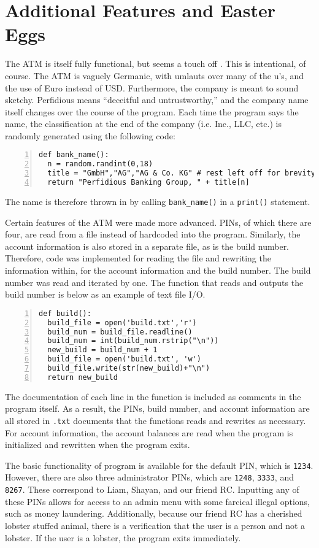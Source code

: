 \documentclass{article}
\begin{document}
\section{Additional Features and Easter Eggs}
The ATM is itself fully functional, but seems a touch off . This is intentional, of course. The ATM is vaguely Germanic, with umlauts over many of the u's, and the use of Euro instead of USD. Furthermore, the company is meant to sound sketchy. Perfidious means ``deceitful and untrustworthy,'' and the company name itself changes over the course of the program. Each time the program says the name, the classification at the end of the company (i.e. Inc., LLC, etc.) is randomly generated using the following code:
\begin{lstlisting}[numbers=left]
def bank_name():
  n = random.randint(0,18)
  title = "GmbH","AG","AG & Co. KG" # rest left off for brevity
  return "Perfidious Banking Group, " + title[n]
\end{lstlisting}
The name is therefore thrown in by calling \texttt{bank\_name()} in a \texttt{print()} statement.

Certain features of the ATM were made more advanced. PINs, of which there are four, are read from a file instead of hardcoded into the program. Similarly, the account information is also stored in a separate file, as is the build number. Therefore, code was implemented for reading the file and rewriting the information within, for the account information and the build number. The build number was read and iterated by one. The function that reads and outputs the build number is below as an example of text file I/O.
\begin{lstlisting}[numbers=left]
def build():
  build_file = open('build.txt','r')
  build_num = build_file.readline()
  build_num = int(build_num.rstrip("\n"))
  new_build = build_num + 1
  build_file = open('build.txt', 'w')
  build_file.write(str(new_build)+"\n")
  return new_build
\end{lstlisting}
The documentation of each line in the function is included as comments in the program itself. As a result, the PINs, build number, and account information are all stored in \texttt{.txt} documents that the functions reads and rewrites as necessary. For account information, the account balances are read when the program is initialized and rewritten when the program exits.

The basic functionality of program is available for the default PIN, which is \texttt{1234}. However, there are also three administrator PINs, which are \texttt{1248}, \texttt{3333}, and \texttt{8267}. These correspond to Liam, Shayan, and our friend RC. Inputting any of these PINs allows for access to an admin menu with some farcical illegal options, such as money laundering. Additionally, because our friend RC has a cherished lobster stuffed animal, there is a verification that the user is a person and not a lobster. If the user is a lobster, the program exits immediately.
\end{document}
